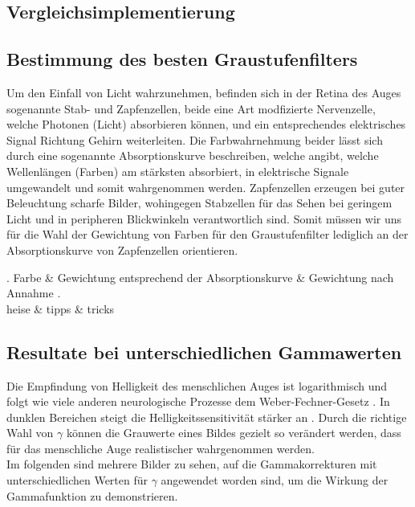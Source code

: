 \documentclass[course=erap]{aspdoc}
\begin{document}
\subsection{Vergleichsimplementierung}

\subsection{Bestimmung des besten Graustufenfilters}
Um den Einfall von Licht wahrzunehmen, befinden sich in der Retina des Auges sogenannte Stab- und Zapfenzellen, beide eine Art modfizierte Nervenzelle, welche Photonen (Licht) absorbieren können, und ein entsprechendes elektrisches Signal Richtung Gehirn weiterleiten.
Die Farbwahrnehmung beider lässt sich durch eine sogenannte Absorptionskurve beschreiben, welche angibt, welche Wellenlängen (Farben) am stärksten absorbiert, in elektrische Signale umgewandelt und somit wahrgenommen werden.
Zapfenzellen erzeugen bei guter Beleuchtung scharfe Bilder, wohingegen Stabzellen für das Sehen bei geringem Licht und in peripheren Blickwinkeln verantwortlich sind. Somit müssen wir uns für die Wahl der Gewichtung von Farben für den Graustufenfilter lediglich an der Absorptionskurve von Zapfenzellen orientieren.
\begin{tabular}
.		Farbe & Gewichtung entsprechend der Absorptionskurve & Gewichtung nach Annahme . \\
	heise & tipps & tricks \\
\end{tabular}

\subsection{Resultate bei unterschiedlichen Gammawerten}
Die Empfindung von Helligkeit des menschlichen Auges ist logarithmisch und folgt wie viele anderen neurologische Prozesse dem Weber-Fechner-Gesetz \cite{weberFechnerGesetz}. In dunklen Bereichen steigt die Helligkeitssensitivität stärker an \cite{Logarithmische_Helligkeitswahrnehmung}. Durch die richtige Wahl von $\gamma$ können die Grauwerte eines Bildes gezielt so verändert werden, dass für das menschliche Auge realistischer wahrgenommen werden. 
\\
\newline
Im folgenden sind mehrere Bilder zu sehen, auf die Gammakorrekturen mit unterschiedlichen Werten für $\gamma$ angewendet worden sind, um die Wirkung der Gammafunktion zu demonstrieren.    
\end{document}
